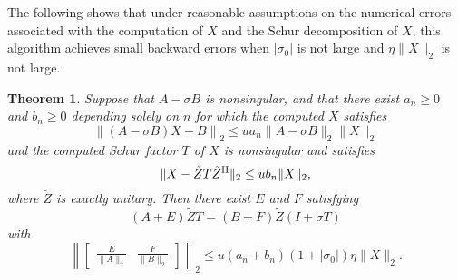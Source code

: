 \documentclass[12pt]{article}
\def\H{{\rm H}}
\newtheorem{theorem}{Theorem}
\begin{document}
The following shows that under reasonable assumptions on the numerical
errors associated with the computation of $X$ and the Schur
decomposition of $X$, this algorithm achieves small backward errors
when $|\sigma_0|$ is not large and $\eta \|X\|_2$ is not large.
\begin{theorem}
  \label{th:deflating_subspaces}
  Suppose that $A-\sigma B$ is nonsingular, and that there exist
  $a_n\geq 0$ and $b_n\geq 0$ depending solely on $n$ for which the
  computed $X$ satisfies
  \begin{equation}
    \label{eq:Xerror}
    \left\| (A-\sigma B) X - B \right\|_2 \leq u a_n \|A-\sigma B\|_2 \|X\|_2
  \end{equation}
  and the computed Schur factor $T$ of $X$ is nonsingular and satisfies
  \begin{equation}
    \label{eq:schur_error}
    \| X - \tilde{Z} T \tilde{Z}^\H \|_2 \leq u b_n \|X\|_2,
  \end{equation}
  where $\tilde{Z}$ is exactly unitary.  Then there exist $E$ and $F$
  satisfying
  \begin{equation*}
    (A+E)\tilde{Z} T = (B+F)\tilde{Z}(I+\sigma T)
  \end{equation*}
  with
  \begin{equation*}
    \left\|
      \begin{bmatrix}
        \frac{E}{\|A\|_2} & \frac{F}{\|B\|_2}
      \end{bmatrix}
    \right\|_2 \leq u (a_n + b_n)(1+|\sigma_0|) \eta \|X\|_2.
  \end{equation*}
\end{theorem}
\end{document}
